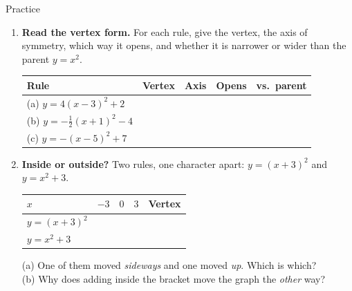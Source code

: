 \documentclass[12pt]{article}
\begin{document}
\boxguard[14]
\begin{notesbox}{Practice}
\small
\begin{enumerate}[leftmargin=1.9em, itemsep=8pt]
  \item \textbf{Read the vertex form.} For each rule, give the vertex, the axis of symmetry,
        which way it opens, and whether it is narrower or wider than the parent $y=x^2$.
    \\[3pt]
    \vspace{-2pt}
    \begin{center}
    \renewcommand{\arraystretch}{1.35}
    \begin{tabularx}{\linewidth}{@{} l Y Y Y Y @{}}
    \textbf{Rule} & \textbf{Vertex} & \textbf{Axis} & \textbf{Opens} & \textbf{vs.\ parent} \\
    \hline
    (a) $y=4(x-3)^2+2$ &  &  &  &  \\
    (b) $y=-\tfrac12(x+1)^2-4$ &  &  &  &  \\
    (c) $y=-(x-5)^2+7$ &  &  &  &  \\
    \end{tabularx}
    \end{center}

  \item \textbf{Inside or outside?} Two rules, one character apart: $y=(x+3)^2$ and $y=x^2+3$.
    \vspace{-2pt}
    \begin{center}
    \renewcommand{\arraystretch}{1.3}
    \begin{tabularx}{\linewidth}{@{} l Y Y Y | X @{}}
    \textbf{$x$} & $-3$ & $0$ & $3$ & \textbf{Vertex} \\
    \hline
    \textbf{$y=(x+3)^2$} &  &  &  &  \\
    \textbf{$y=x^2+3$} &  &  &  &  \\
    \end{tabularx}
    \end{center}
    (a) One of them moved \emph{sideways} and one moved \emph{up}. Which is which?
         \\[3pt]
    (b) Why does adding inside the bracket move the graph the \emph{other} way? 


\end{enumerate}
\end{notesbox}
\end{document}
